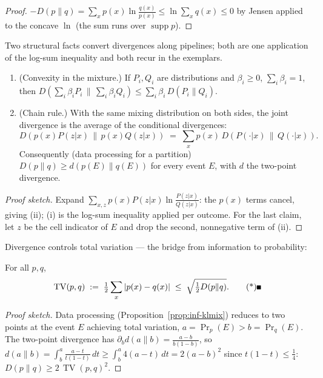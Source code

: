 \begin{proof}
$-D(p\|q) = \sum_x p(x)\ln\frac{q(x)}{p(x)} \le \ln\sum_x q(x) \le 0$ by Jensen
applied to the concave $\ln$ (the sum runs over $\operatorname{supp} p$).
\end{proof}

Two structural facts convert divergences along pipelines; both are one application of
the log-sum inequality \citep{information-theory-bg2} and both recur in the exemplars.

\begin{proposition}\label{prop:inf-klmix}
\leavevmode
\begin{enumerate}
\item (Convexity in the mixture.) If $P_i, Q_i$ are distributions and $\beta_i \ge
0$, $\sum_i \beta_i = 1$, then $D(\sum_i \beta_i P_i \,\|\, \sum_i \beta_i Q_i)
\le \sum_i \beta_i\,D(P_i \| Q_i)$.
\item (Chain rule.) With the same mixing distribution on both sides, the joint divergence
is the average of the conditional divergences:
\[
D(p(x)P(z|x) \,\|\, p(x)Q(z|x)) \;=\; \sum_x p(x)\,
D(P(\cdot|x) \,\|\, Q(\cdot|x)).
\]
Consequently
(data processing for a partition) $D(p\|q) \ge d(p(E) \| q(E))$ for every event $E$,
with $d$ the two-point divergence. \eop
\end{enumerate}
\end{proposition}

\begin{proof}[Proof sketch]
Expand $\sum_{x,z} p(x)P(z|x)\ln\frac{P(z|x)}{Q(z|x)}$: the $p(x)$ terms cancel,
giving (ii); (i) is the log-sum inequality applied per outcome. For the last claim,
let $z$ be the cell indicator of $E$ and drop the second, nonnegative term of (ii).
\end{proof}

Divergence controls total variation --- the bridge from information to probability:

\begin{theorem}[Pinsker]\label{thm:inf-pinsker}
For all $p, q$,
\[
\operatorname{TV}(p,q) \;:=\; \tfrac12 \sum_x |p(x) - q(x)| \;\le\;
\sqrt{\tfrac12 D(p\|q)}. \eopm
\]
\end{theorem}

\begin{proof}[Proof sketch]
Data processing (Proposition~\ref{prop:inf-klmix}) reduces to two points at the event
$E$ achieving total variation, $a = \Pr_p(E) > b = \Pr_q(E)$. The two-point divergence
has $\partial_b d(a\|b) = \frac{a-b}{b(1-b)}$, so $d(a\|b) = \int_b^a
\frac{a-t}{t(1-t)}\,dt \ge \int_b^a 4(a-t)\,dt = 2(a-b)^2$ since $t(1-t) \le
\tfrac14$: $D(p\|q) \ge 2\,\operatorname{TV}(p,q)^2$.
\end{proof}

